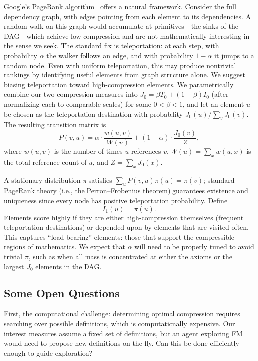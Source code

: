 \documentclass[12pt]{amsart}
\theoremstyle{definition}
\theoremstyle{remark}
\begin{document}
Google's PageRank algorithm~\cite{brin1998anatomy} offers a natural framework.
Consider the full dependency graph, with edges pointing from each element to its dependencies.
A random walk on this graph would accumulate at primitives---the sinks of the DAG---which achieve low compression and are not mathematically interesting in the sense we seek.
The standard fix is teleportation: at each step, with probability $\alpha$ the walker follows an edge, and with probability $1 - \alpha$ it jumps to a random node.
Even with uniform teleportation, this may produce nontrivial rankings by identifying useful elements from graph structure alone.
We suggest biasing teleportation toward high-compression elements.
We parametrically combine our two compression measures into $J_0 = \beta T_0 + (1-\beta) I_0$ (after normalizing each to comparable scales) for some $0 < \beta < 1$, and let an element $u$ be chosen as the teleportation destination with probability $J_0(u) / \sum_v J_0(v)$.
The resulting transition matrix is
\[
P(v, u) = \alpha \cdot \frac{w(u, v)}{W(u)} + (1 - \alpha) \cdot \frac{J_0(v)}{Z},
\]
where $w(u,v)$ is the number of times $u$ references $v$, $W(u) = \sum_x w(u,x)$ is the total reference count of $u$, and $Z = \sum_x J_0(x)$.

A stationary distribution $\pi$ satisfies $\sum_u P(v, u) \pi(u) = \pi(v)$; standard PageRank theory (i.e., the Perron--Frobenius theorem) guarantees existence and uniqueness since every node has positive teleportation probability.
Define
\[
I_1(u) = \pi(u).
\]
Elements score highly if they are either high-compression themselves (frequent teleportation destinations) or depended upon by elements that are visited often.
This captures ``load-bearing'' elements: those that support the compressible regions of mathematics.
We expect that $\alpha$ will need to be properly tuned to avoid trivial $\pi$, such as when all mass is concentrated at either the axioms or the largest $J_0$ elements in the DAG.

\subsection{Some Open Questions}

First, the computational challenge: determining optimal compression requires searching over possible definitions, which is computationally expensive.
Our interest measures assume a fixed set of definitions, but an agent exploring FM would need to propose new definitions on the fly.
Can this be done efficiently enough to guide exploration?
\end{document}
